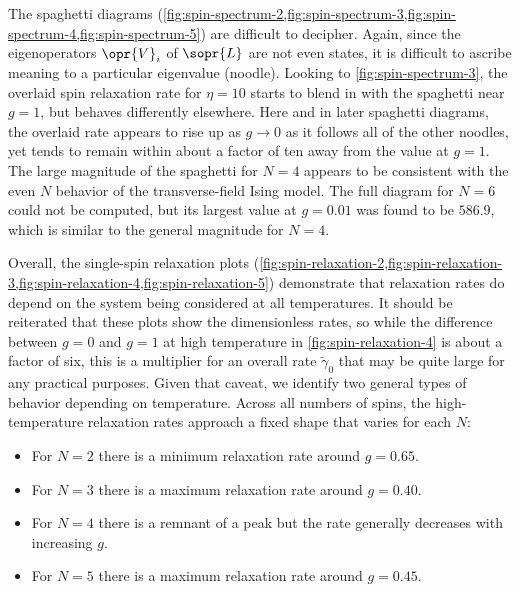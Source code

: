 The spaghetti diagrams
(\cref{fig:spin-spectrum-2,fig:spin-spectrum-3,fig:spin-spectrum-4,fig:spin-spectrum-5})
are difficult to decipher. Again, since the eigenoperators $\opr{V}_i$ of
$\sopr{L}$ are not even states, it is difficult to ascribe meaning to a
particular eigenvalue (noodle). Looking to \cref{fig:spin-spectrum-3}, the
overlaid spin relaxation rate for $\eta = 10$ starts to blend in with the
spaghetti near $g = 1$, but behaves differently elsewhere. Here and in later
spaghetti diagrams, the overlaid rate appears to rise up as $g \to 0$ as it
follows all of the other noodles, yet tends to remain within about a factor of
ten away from the value at $g = 1$. The large magnitude of the spaghetti for $N
= 4$ appears to be consistent with the even $N$ behavior of the transverse-field
Ising model. The full diagram for $N = 6$ could not be computed, but its largest
value at $g = 0.01$ was found to be $586.9$, which is similar to the general
magnitude for $N = 4$.

Overall, the single-spin relaxation plots
(\cref{fig:spin-relaxation-2,fig:spin-relaxation-3,fig:spin-relaxation-4,fig:spin-relaxation-5})
demonstrate that relaxation rates do depend on the system being considered at
all temperatures. It should be reiterated that these plots show the
dimensionless rates, so while the difference between $g = 0$ and $g = 1$ at high
temperature in \cref{fig:spin-relaxation-4} is about a factor of six, this is a
multiplier for an overall rate $\tilde{\gamma}_0$ that may be quite large for
any practical purposes. Given that caveat, we identify two general types of
behavior depending on temperature. Across all numbers of spins, the
high-temperature relaxation rates approach a fixed shape that varies for each
$N$:
\begin{itemize}
  \item For $N = 2$ there is a minimum relaxation rate around $g = 0.65$.
  \item For $N = 3$ there is a maximum relaxation rate around $g = 0.40$.
  \item For $N = 4$ there is a remnant of a peak but the rate generally
    decreases with increasing $g$.
  \item For $N = 5$ there is a maximum relaxation rate around $g = 0.45$.
\end{itemize}

